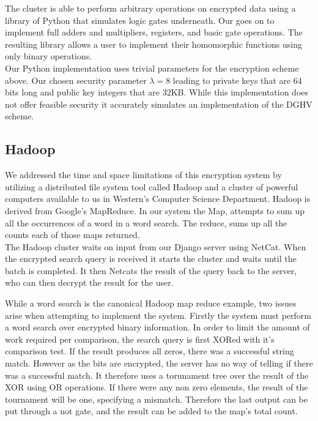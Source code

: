 \documentclass[letterpaper,11pt]{article} %
\begin{document}
The cluster is able to perform arbitrary operations on encrypted data using a library of Python that simulates logic gates underneath. Our goes on to implement full adders and multipliers, registers, and basic gate operations. The resulting library allows a user to implement their homomorphic functions using only binary operations.\\

Our Python implementation uses trivial parameters for the encryption scheme above. Our chosen security parameter $\lambda=8$ leading to private keys that are 64 bits long and public key integers that are 32KB. While this implementation does not offer feasible security it accurately simulates an implementation of the DGHV scheme.


\subsection*{Hadoop}


 We addressed the time and space limitations of this encryption system by utilizing a distributed file system tool called Hadoop and a cluster of powerful computers available to us in Western's Computer Science Department. Hadoop is derived from Google's MapReduce. In our system the Map, attempts to sum up all the occurrences of a word in a word search. The reduce, sums up all the counts each of those maps returned.\\

The Hadoop cluster waits on input from our Django server using NetCat. When the encrypted search query is received it starts the cluster and waits until the batch is completed. It then Netcats the result of the query back to the server, who can then decrypt the result for the user.

While a word search is the canonical Hadoop map reduce example, two issues arise when attempting to implement the system. Firstly the system must perform a word search over encrypted binary information. In order to limit the amount of work required per comparison, the search query is first XORed with it's comparison test. If the result produces all zeros, there was a successful string match. However as the bits are encrypted, the server has no way of telling if there was a successful match. It therefore uses a torunament tree over the result of the XOR using OR operations. If there were any non zero elements, the result of the tournament will be one, specifying a mismatch. Therefore the last output can be put through a not gate, and the result can be added to the map's total count.
\end{document}
